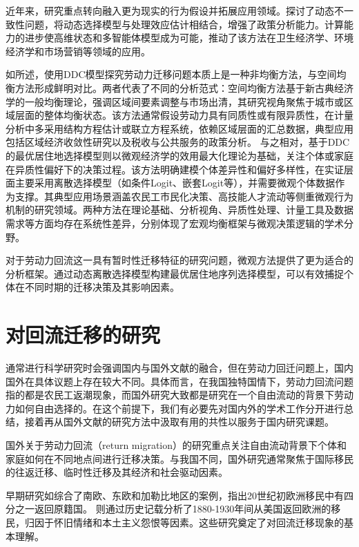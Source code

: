 \documentclass[a4paper, zihao=-4, fontset = mac, oneside]{ctexbook} %
\begin{document}
近年来，研究重点转向融入更为现实的行为假设并拓展应用领域。\textcite{utaraDynamicDiscreteChoice2024}探讨了动态不一致性问题，\textcite{heckmanDynamicDiscreteChoice2007}将动态选择模型与处理效应估计相结合，增强了政策分析能力。计算能力的进步使高维状态和多智能体模型成为可能，推动了该方法在卫生经济学、环境经济学和市场营销等领域的应用。

如\textcite{jiaEconomicsInternalMigration2023}所述，使用DDC模型探究劳动力迁移问题本质上是一种非均衡方法，与空间均衡方法形成鲜明对比。两者代表了不同的分析范式：空间均衡方法基于新古典经济学的一般均衡理论，强调区域间要素调整与市场出清，其研究视角聚焦于城市或区域层面的整体均衡状态。该方法通常假设劳动力具有同质性或有限异质性，在计量分析中多采用结构方程估计或联立方程系统，依赖区域层面的汇总数据，典型应用包括区域经济收敛性研究以及税收与公共服务的政策分析。
与之相对，基于DDC的最优居住地选择模型则以微观经济学的效用最大化理论为基础，关注个体或家庭在异质性偏好下的决策过程。该方法明确建模个体差异性和偏好多样性，在实证层面主要采用离散选择模型（如条件Logit、嵌套Logit等），并需要微观个体数据作为支撑。其典型应用场景涵盖农民工市民化决策、高技能人才流动等侧重微观行为机制的研究领域。两种方法在理论基础、分析视角、异质性处理、计量工具及数据需求等方面均存在系统性差异，分别体现了宏观均衡框架与微观决策逻辑的学术分野。

对于劳动力回流这一具有暂时性迁移特征的研究问题，微观方法提供了更为适合的分析框架。通过动态离散选择模型构建最优居住地序列选择模型，可以有效捕捉个体在不同时期的迁移决策及其影响因素。

\section{对回流迁移的研究}

通常进行科学研究时会强调国内与国外文献的融合，但在劳动力回迁问题上，国内国外在具体议题上存在较大不同。具体而言，在我国独特国情下，劳动力回流问题指的都是农民工返潮现象，而国外研究大致都是研究在一个自由流动的背景下劳动力如何自由选择的。在这个前提下，我们有必要先对国内外的学术工作分开进行总结，接着再从国外文献的研究方法中汲取有用的共性以服务于国内研究课题。

国外关于劳动力回流（return migration）的研究重点关注自由流动背景下个体和家庭如何在不同地点间进行迁移决策。与我国不同，国外研究通常聚焦于国际移民的往返迁移、临时性迁移及其经济和社会驱动因素。

早期研究如\textcite{gmelchReturnMigration1980}综合了南欧、东欧和加勒比地区的案例，指出20世纪初欧洲移民中有四分之一返回原籍国。
\textcite{wymanRoundtripAmericaImmigrants1993}则通过历史记载分析了1880-1930年间从美国返回欧洲的移民，归因于怀旧情绪和本土主义怨恨等因素。这些研究奠定了对回流迁移现象的基本理解。
\end{document}

